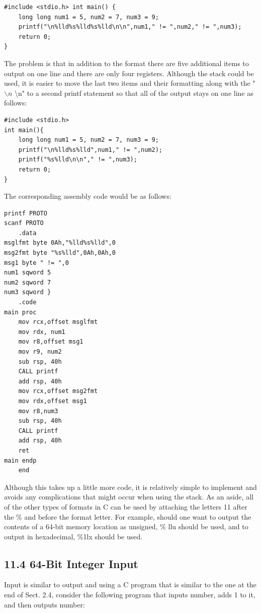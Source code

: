 \documentclass[10pt]{article}
\begin{document}
\begin{verbatim}
#include <stdio.h> int main() {
    long long num1 = 5, num2 = 7, num3 = 9;
    printf("\n%lld%s%lld%s%lld\n\n",num1," != ",num2," != ",num3);
    return 0;
}
\end{verbatim}

The problem is that in addition to the format there are five additional items to output on one line and there are only four registers. Although the stack could be used, it is easier to move the last two items and their formatting along with the " $\backslash n$ \textbackslash n" to a second printf statement so that all of the output stays on one line as follows:

\begin{verbatim}
#include <stdio.h>
int main(){
    long long num1 = 5, num2 = 7, num3 = 9;
    printf("\n%lld%s%lld",num1," != ",num2);
    printf("%s%lld\n\n"," != ",num3);
    return 0;
}
\end{verbatim}

The corresponding assembly code would be as follows:

\begin{verbatim}
printf PROTO
scanf PROTO
    .data
msglfmt byte 0Ah,"%lld%s%lld",0
msg2fmt byte "%s%lld",0Ah,0Ah,0
msg1 byte " != ",0
num1 sqword 5
num2 sqword 7
num3 sqword }
    .code
main proc
    mov rcx,offset msglfmt
    mov rdx, num1
    mov r8,offset msg1
    mov r9, num2
    sub rsp, 40h
    CALL printf
    add rsp, 40h
    mov rcx,offset msg2fmt
    mov rdx,offset msg1
    mov r8,num3
    sub rsp, 40h
    CALL printf
    add rsp, 40h
    ret
main endp
    end
\end{verbatim}

Although this takes up a little more code, it is relatively simple to implement and avoids any complications that might occur when using the stack. As an aside, all of the other types of formats in C can be used by attaching the letters 11 after the \% and before the format letter. For example, should one want to output the contents of a 64-bit memory location as unsigned, \% llu should be used, and to output in hexadecimal, \%1lx should be used.

\subsection*{11.4 64-Bit Integer Input}
Input is similar to output and using a C program that is similar to the one at the end of Sect. 2.4, consider the following program that inputs number, adds 1 to it, and then outputs number:
\end{document}
